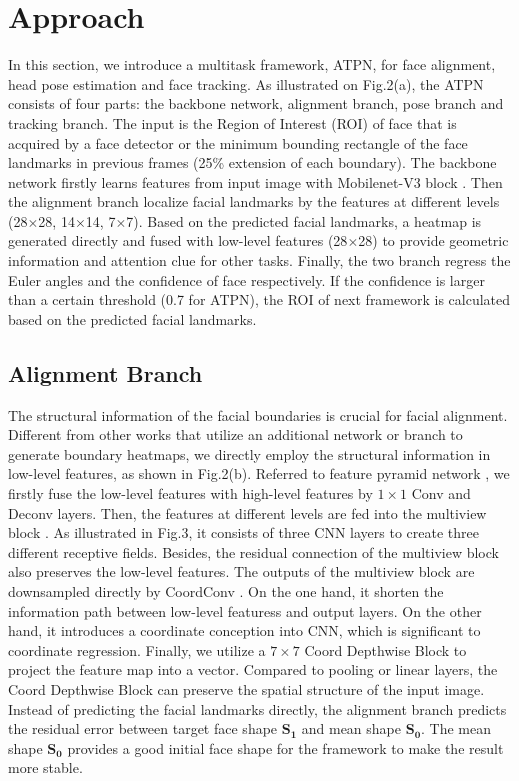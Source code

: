 \documentclass[3p,twocolumn, round, sort & compress]{elsarticle}
\begin{document}
\section{Approach}
In this section, we introduce a multitask framework, ATPN, for face alignment, head pose estimation and face tracking. As illustrated on Fig.2(a), the ATPN consists of four parts: the backbone network, alignment branch, pose branch and tracking branch. The input is the Region of Interest (ROI) of face that is acquired by a face detector or the minimum bounding rectangle of the face landmarks in previous frames (25\% extension of each boundary). The backbone network firstly learns features from input image with Mobilenet-V3 block \citep{mobileV3}. Then the alignment branch localize facial landmarks by the features at different levels (28$\times$28, 14$\times$14, 7$\times$7). Based on the predicted facial landmarks, a heatmap is generated directly and fused with low-level features (28$\times$28) to provide geometric information and attention clue for other tasks. Finally, the two branch regress the Euler angles and the confidence of face respectively. If the confidence is larger than a certain threshold (0.7 for ATPN), the ROI of next framework is calculated based on the predicted facial landmarks. 

\subsection{Alignment Branch}
The structural information of the facial boundaries is crucial for facial alignment. Different from other works \citep{LAB, PropNet} that utilize an additional network or branch to generate boundary heatmaps, we directly employ the structural information in low-level features, as shown in Fig.2(b). Referred to feature pyramid network \citep{FPN}, we firstly fuse the low-level features with high-level features by $1\times1$ Conv and Deconv layers. Then, the features at different levels are fed into the multiview block \citep{MVB}. As illustrated in Fig.3, it consists of three CNN layers to create three different receptive fields. Besides, the residual connection of the multiview block also preserves the low-level features. The outputs of the multiview block are downsampled directly by CoordConv \citep{CoordCNN}. On the one hand, it shorten the information path between low-level featuress and output layers. On the other hand, it introduces a coordinate conception into CNN, which is significant to coordinate regression. Finally, we utilize a $7 \times 7$ Coord Depthwise Block to project the feature map into a vector. Compared to pooling or linear layers, the Coord Depthwise Block can preserve the spatial structure of the input image. Instead of predicting the facial landmarks directly, the alignment branch predicts the residual error between target face shape $\bm{S_1}$ and mean shape $\bm{S_0}$. The mean shape $\bm{S_0}$ provides a good initial face shape for the framework to make the result more stable.    
 
\end{document}
